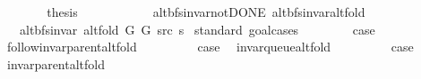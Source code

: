 \begin{isabellebody}
\ \ \ \ \isamarkupfalse%
\ \isamarkupfalse%
\ {\isacharquery}{\kern0pt}thesis\isanewline
\ \ \ \ \ \ \isacommand{{\isachardot}{\kern0pt}}\isamarkupfalse%
\isanewline
\ \ \isamarkupfalse%
\isanewline
{}\isamarkupfalse%
%
\endisatagproof
{\isafoldproof}%
%
\isadelimproof
%
\endisadelimproof
%
\isadelimdocument
%
\endisadelimdocument
%
\isatagdocument
%
\isamarkupsubsubsection{%
}
\isamarkuptrue%
%
\endisatagdocument
{\isafolddocument}%
%
\isadelimdocument
%
\endisadelimdocument
{}\isamarkupfalse%
\ {\isacharparenleft}{\kern0pt}\ alt{\isacharunderscore}{\kern0pt}bfs{\isacharunderscore}{\kern0pt}invar{\isacharunderscore}{\kern0pt}not{\isacharunderscore}{\kern0pt}DONE{\isacharparenright}{\kern0pt}\ alt{\isacharunderscore}{\kern0pt}bfs{\isacharunderscore}{\kern0pt}invar{\isacharunderscore}{\kern0pt}alt{\isacharunderscore}{\kern0pt}fold{\isacharcolon}{\kern0pt}\isanewline
\ \ \ {\isachardoublequoteopen}alt{\isacharunderscore}{\kern0pt}bfs{\isacharunderscore}{\kern0pt}invar{\isacharprime}{\kern0pt}{\isacharprime}{\kern0pt}\ {\isacharparenleft}{\kern0pt}alt{\isacharunderscore}{\kern0pt}fold\ G{}\ G{}\ src\ s{\isacharparenright}{\kern0pt}{\isachardoublequoteclose}\isanewline
%
\isadelimproof
%
\endisadelimproof
%
\isatagproof
{}\isamarkupfalse%
\ {\isacharparenleft}{\kern0pt}standard{\isacharcomma}{\kern0pt}\ goal{\isacharunderscore}{\kern0pt}cases{\isacharparenright}{\kern0pt}\isanewline
\ \ \isamarkupfalse%
\ {}\isanewline
\ \ \isamarkupfalse%
\ {\isacharquery}{\kern0pt}case\ \isamarkupfalse%
\ follow{\isacharunderscore}{\kern0pt}invar{\isacharunderscore}{\kern0pt}parent{\isacharunderscore}{\kern0pt}alt{\isacharunderscore}{\kern0pt}fold\ \isacommand{{\isachardot}{\kern0pt}}\isamarkupfalse%
\isanewline
{}\isamarkupfalse%
\isanewline
\ \ \isamarkupfalse%
\ {}\isanewline
\ \ \isamarkupfalse%
\ {\isacharquery}{\kern0pt}case\ \isamarkupfalse%
\ invar{\isacharunderscore}{\kern0pt}queue{\isacharunderscore}{\kern0pt}alt{\isacharunderscore}{\kern0pt}fold\ \isacommand{{\isachardot}{\kern0pt}}\isamarkupfalse%
\isanewline
{}\isamarkupfalse%
\isanewline
\ \ \isamarkupfalse%
\ {}\isanewline
\ \ \isamarkupfalse%
\ {\isacharquery}{\kern0pt}case\ \isamarkupfalse%
\ invar{\isacharunderscore}{\kern0pt}parent{\isacharunderscore}{\kern0pt}alt{\isacharunderscore}{\kern0pt}fold\ \isacommand{{\isachardot}{\kern0pt}}\isamarkupfalse%

\end{isabellebody}
